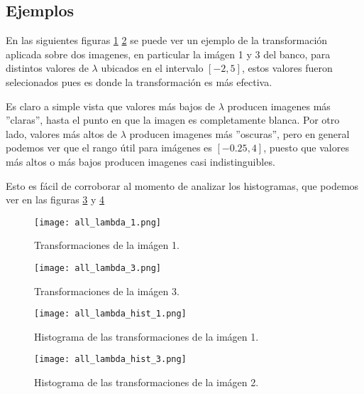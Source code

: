     \subsection{Ejemplos}
    
    En las siguientes figuras \ref{fig:all_lambda_1} \ref{fig:all_lambda_2} se puede ver un ejemplo de la transformaci\'on aplicada sobre dos imagenes, en particular la im\'agen 1 y 3 del banco, para distintos valores de $\lambda$ ubicados en el intervalo $[-2,5]$, estos valores fueron selecionados pues es donde la transformaci\'on es m\'as efectiva.

    Es claro a simple vista que valores m\'as bajos de $\lambda$ producen imagenes m\'as ''claras'', hasta el punto en que la imagen es completamente blanca. Por otro lado, valores m\'as altos de $\lambda$ producen imagenes m\'as ''oscuras'', pero en general podemos ver que el rango \'util para im\'agenes es $[-0.25,4]$, puesto que valores m\'as altos o m\'as bajos producen imagenes casi indistinguibles. 

    Esto es f\'acil de corroborar al momento de analizar los histogramas, que podemos ver en las figuras \ref{fig:img_bci_hist_1} y \ref{fig:img_bci_hist_2} 

    \begin{figure}
        \centering
        \texttt{[image: all\_lambda\_1.png]}
        \caption{Transformaciones de la im\'agen 1.}
        \label{fig:all_lambda_1}
    \end{figure}

    \begin{figure}
        \centering
        \texttt{[image: all\_lambda\_3.png]}
        \caption{Transformaciones de la im\'agen 3.}
        \label{fig:all_lambda_2}
    \end{figure}

    \begin{figure}
        \centering
        \texttt{[image: all\_lambda\_hist\_1.png]}
        \caption{Histograma de las transformaciones de la im\'agen 1.}
        \label{fig:img_bci_hist_1}
    \end{figure}

    \begin{figure}
        \centering
        \texttt{[image: all\_lambda\_hist\_3.png]}
        \caption{Histograma de las transformaciones de la im\'agen 2.}
        \label{fig:img_bci_hist_2}
    \end{figure}

